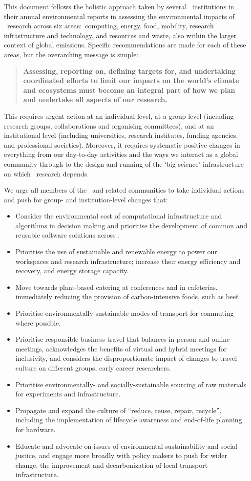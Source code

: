 \documentclass[../SustainableHEP.tex]{subfiles}
\begin{document}
This document follows the holistic approach taken by several \ACR\ institutions in their annual environmental reports in assessing the environmental impacts of \ACR\ research across six areas:\ computing, energy, food, mobility, research infrastructure and technology, and resources and waste, also within the larger context of global emissions. Specific recommendations are made for each of these areas, but the overarching message is simple:
\begin{quotation}
{\bfseries Assessing, reporting on, defining targets for, and undertaking coordinated efforts to limit our impacts on the world's climate and ecosystems must become an integral part of how we plan and undertake all aspects of our research.}
\end{quotation}
This requires urgent action at an individual level, at a group level (including research groups, collaborations and organising committees), and at an institutional level (including universities, research institutes, funding agencies, and professional societies). Moreover, it requires systematic positive changes in everything from our day-to-day activities and the ways we interact as a global community through to the design and running of the `big science' infrastructure on which \ACR\ research depends.

We urge all members of the \ACR\ and related communities to take individual actions and push for group- and institution-level changes that:
\begin{itemize}
      \item Consider the environmental cost of computational infrastructure and algorithms in decision making and prioritise the development of common and reusable software solutions across \ACR.
     \item Prioritise the use of sustainable and renewable energy to power our workspaces and research infrastructure; increase their energy efficiency and recovery, and energy storage capacity.
    \item Move towards plant-based catering at conferences and in cafeterias, immediately reducing the provision of carbon-intensive foods, such as beef.
    \item Prioritise environmentally sustainable modes of transport for commuting where possible.
    \item Prioritise responsible business travel that balances in-person and online meetings, acknowledges the benefits of virtual and hybrid meetings for inclusivity, and considers the disproportionate impact of changes to travel culture on different groups, \eg early career researchers.
     \item Prioritise environmentally- and socially-sustainable sourcing of raw materials for experiments and infrastructure.
    \item Propagate and expand the culture of ``reduce, reuse, repair, recycle'', including the implementation of lifecycle awareness and end-of-life planning for hardware.
    \item Educate and advocate on issues of environmental sustainability and social justice,  and engage more broadly with policy makers to push for wider change, \eg the improvement and decarbonization of local transport infrastructure.
\end{itemize}
\end{document}
